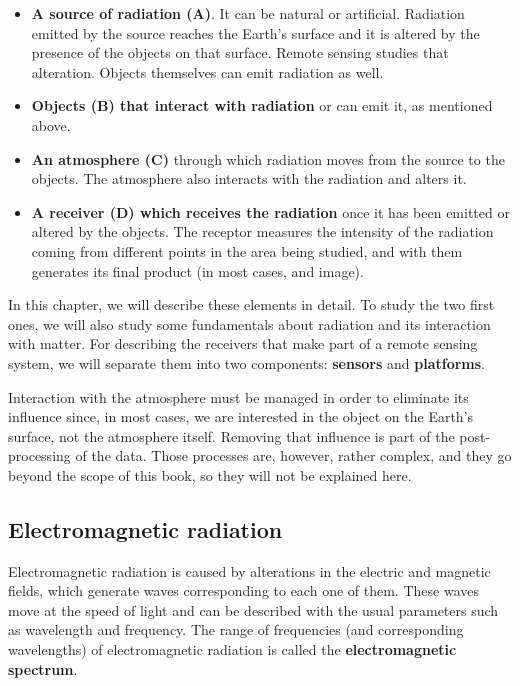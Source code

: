 \begin{itemize}
	\item \textbf{A source of radiation (A)}. It can be natural or artificial. Radiation emitted by the source reaches the Earth's surface and it is altered by the presence of the objects on that surface. Remote sensing studies that alteration. Objects themselves can emit radiation as well.
	\item \textbf{Objects (B) that interact with radiation} or can emit it, as mentioned above.
	\item \textbf{An atmosphere (C)} through which radiation moves from the source to the objects. The atmosphere also interacts with the radiation and alters it.
	\item \textbf{A receiver (D) which receives the radiation} once it has been emitted or altered by the objects. The receptor measures the intensity of the radiation coming from different points in the area being studied, and with them generates its final product (in most cases, and image). 
\end{itemize}

In this chapter, we will describe these elements in detail. To study the two first ones, we will also study some fundamentals about radiation and its interaction with matter. For describing the receivers that make part of a remote sensing system, we will separate them into two components: \textbf{sensors} and \textbf{platforms}.

Interaction with the atmosphere must be managed in order to eliminate its influence since, in most cases, we are interested in the object on the Earth's surface, not the atmosphere itself. Removing that influence is part of the post-processing of the data. Those processes are, however, rather complex, and they go beyond the scope of this book, so they will not be explained here.


\subsection{Electromagnetic radiation}

Electromagnetic radiation is caused by alterations in the electric and magnetic fields, which generate waves corresponding to each one of them. These waves move at the speed of light and can be described with the usual parameters such as wavelength and frequency. The range of frequencies (and corresponding wavelengths) of electromagnetic radiation is called the \textbf{electromagnetic spectrum}.

